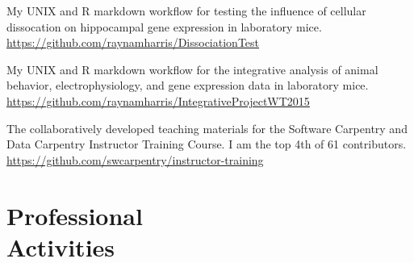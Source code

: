 \documentclass[margin,line]{resume}
\begin{document}
\begin{resume}
\begin{description}
\setlength{\itemsep}{3pt}
\item [\href{https://github.com/raynamharris/DissociationTest}{DissociationTest}] My UNIX and R markdown workflow for testing the influence of cellular dissocation on hippocampal gene expression in laboratory mice.\\ \url{https://github.com/raynamharris/DissociationTest}
\item [\href{https://github.com/raynamharris/IntegrativeProjectWT2015}{IntegrativeProjectWT2015}] My UNIX and R markdown workflow for the integrative analysis of animal behavior, electrophysiology, and gene expression data in laboratory mice. \\ \url{https://github.com/raynamharris/IntegrativeProjectWT2015}
\item [\href{https://github.com/swcarpentry/instructor-training}{instructor-training}] The collaboratively developed teaching materials for the Software Carpentry and Data Carpentry Instructor Training Course. I am the top 4th of 61 contributors. \\ \url{https://github.com/swcarpentry/instructor-training}

\end{description}


    
\section{\mysidestyle Professional\\Activities}


\end{resume}
\end{document}
